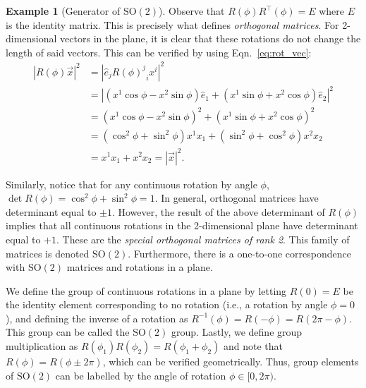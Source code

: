 \documentclass[12pt]{report}
\newcommand{\ehat}{\hat{e}}
\newcommand{\mat}[3]{{{#1}^#2}_#3}
\newcommand{\sotwo}{\textrm{SO}{(2)}}
\theoremstyle{definition}
\newtheorem{example}{Example}[chapter]
\begin{document}
\begin{example}[Generator of $\sotwo$]
    Observe that $R(\phi)R^\top(\phi) = E$ where $E$ is the identity matrix. This is precisely what defines \textit{orthogonal matrices}. For 2-dimensional vectors in the plane, it is clear that these rotations do not change the length of said vectors. This can be verified by using Eqn.~\ref{eq:rot_vec}:
    \begin{align}
        |R(\phi)\vec{x}|^2 &= |\ehat_j\mat{R(\phi)}{j}{i} x^i|^2 \\
        &= \left|\left( x^1\cos\phi - x^2\sin\phi \right)\ehat_1 + \left( x^1\sin\phi + x^2\cos\phi \right)\ehat_2\right|^2 \nonumber \\
        &= {\left( x^1\cos\phi - x^2\sin\phi \right)}^2 + {\left( x^1\sin\phi + x^2\cos\phi \right)}^2 \nonumber \\
        &= \left( \cos^2\phi + \sin^2\phi \right)x^1 x_1 + \left( \sin^2\phi + \cos^2\phi \right)x^2 x_2 \nonumber \\
        &= x^1 x_1 + x^2 x_2 = |\vec{x}|^2. \nonumber
    \end{align}

    Similarly, notice that for any continuous rotation by angle $\phi$, $\det R(\phi) = \cos^2\phi+\sin^2\phi = 1$. In general, orthogonal matrices have determinant equal to $\pm1$. However, the result of the above determinant of $R(\phi)$ implies that all continuous rotations in the 2-dimensional plane have determinant equal to $+1$. These are the \textit{special orthogonal matrices of rank 2}. This family of matrices is denoted $\sotwo$. Furthermore, there is a one-to-one correspondence with $\sotwo$ matrices and rotations in a plane.

    We define the group of continuous rotations in a plane by letting $R(0) = E$ be the identity element corresponding to no rotation (i.e., a rotation by angle $\phi=0$), and defining the inverse of a rotation as $R^{-1}(\phi) = R(-\phi) = R(2\pi-\phi)$. This group can be called the $\sotwo$ group. Lastly, we define group multiplication as $R(\phi_1)R(\phi_2) = R(\phi_1+\phi_2)$ and note that $R(\phi) = R(\phi\pm2\pi)$, which can be verified geometrically. Thus, group elements of $\sotwo$ can be labelled by the angle of rotation $\phi\in[0,2\pi)$.


\end{example}
\end{document}
